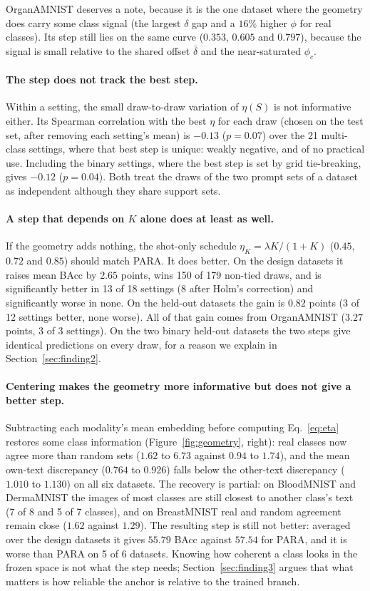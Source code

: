 OrganAMNIST deserves a note, because it is the one dataset where the geometry does carry some class signal
(the largest $\delta$ gap and a $16\%$ higher $\phi$ for real classes).
Its step still lies on the same curve ($0.353$, $0.605$ and $0.797$),
because the signal is small relative to the shared offset $\bar\delta$ and the near-saturated $\phi_c$.

\paragraph{The step does not track the best step.}
Within a setting, the small draw-to-draw variation of $\eta(S)$ is not informative either.
Its Spearman correlation with the best $\eta$ for each draw (chosen on the test set, after removing each setting's mean)
is $-0.13$ ($p = 0.07$) over the 21 multi-class settings, where that best step is unique: weakly negative, and of no practical use.
Including the binary settings, where the best step is set by grid tie-breaking, gives $-0.12$ ($p = 0.04$).
Both treat the draws of the two prompt sets of a dataset as independent although they share support sets.

\paragraph{A step that depends on $K$ alone does at least as well.}
If the geometry adds nothing, the shot-only schedule $\eta_K = \lambda K / (1 + K)$ ($0.45$, $0.72$ and $0.85$) should match PARA.
It does better.
On the design datasets it raises mean BAcc by $2.65$ points, wins 150 of 179 non-tied draws,
and is significantly better in 13 of 18 settings (8 after Holm's correction) and significantly worse in none.
On the held-out datasets the gain is $0.82$ points (3 of 12 settings better, none worse).
All of that gain comes from OrganAMNIST ($3.27$ points, 3 of 3 settings).
On the two binary held-out datasets the two steps give identical predictions on every draw,
for a reason we explain in Section~\ref{sec:finding2}.

\paragraph{Centering makes the geometry more informative but does not give a better step.}
Subtracting each modality's mean embedding before computing Eq.~\eqref{eq:eta} restores some class information
(Figure~\ref{fig:geometry}, right): real classes now agree more than random sets ($1.62$ to $6.73$ against $0.94$ to $1.74$),
and the mean own-text discrepancy ($0.764$ to $0.926$) falls below the other-text discrepancy ($1.010$ to $1.130$) on all six datasets.
The recovery is partial: on BloodMNIST and DermaMNIST the images of most classes are still closest to another class's text
(7 of 8 and 5 of 7 classes), and on BreastMNIST real and random agreement remain close ($1.62$ against $1.29$).
The resulting step is still not better: averaged over the design datasets it gives $55.79$ BAcc against $57.54$ for PARA,
and it is worse than PARA on 5 of 6 datasets.
Knowing how coherent a class looks in the frozen space is not what the step needs;
Section~\ref{sec:finding3} argues that what matters is how reliable the anchor is relative to the trained branch.
